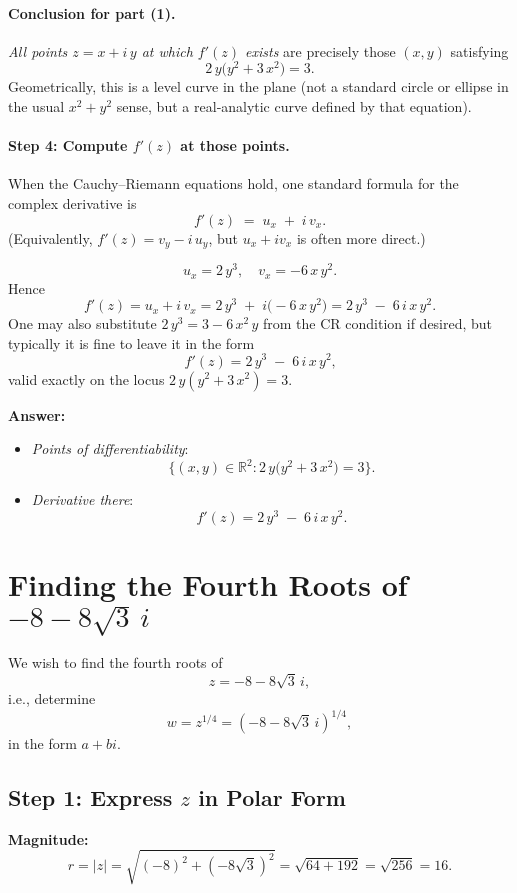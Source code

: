 \documentclass[12pt]{article}
\theoremstyle{definition} %
\theoremstyle{plain} %
\begin{document}
\paragraph{Conclusion for part (1).}
\emph{All points $z=x+ i\,y$ at which $f'(z)$ exists} are precisely those $(x,y)$ satisfying
\[
2\,y\bigl(y^{2} + 3\,x^{2}\bigr) = 3.
\]
Geometrically, this is a level curve in the plane (not a standard circle or ellipse in the usual $x^2 + y^2$ sense, but a real‐analytic curve defined by that equation).

\paragraph{Step 4: Compute $f'(z)$ at those points.}
When the Cauchy--Riemann equations hold, one standard formula for the complex derivative is
\[
f'(z) \;=\; u_{x} \;+\; i\,v_{x}.
\]
(Equivalently, $f'(z) = v_{y} - i\,u_{y}$, but $u_x + i v_x$ is often more direct.)

\[
u_{x} = 2\,y^{3},
\quad
v_{x} = -6\,x\,y^{2}.
\]
Hence
\[
f'(z) 
= u_{x} + i\,v_{x}
= 2\,y^{3} \;+\; i\bigl(-6\,x\,y^{2}\bigr)
= 2\,y^{3} \;-\; 6\,i\,x\,y^{2}.
\]
One may also substitute $2\,y^{3} = 3 - 6\,x^{2}\,y$ from the CR condition if desired, but typically it is fine to leave it in the form
\[
\boxed{\,f'(z) = 2\,y^{3} \;-\; 6\,i\,x\,y^{2},}
\]
valid exactly on the locus $2\,y(y^{2} + 3\,x^{2})=3$.

\bigskip

\noindent
\textbf{Answer:}
\begin{itemize}
\item 
\emph{Points of differentiability}: 
\[
\{(x,y)\in \mathbb{R}^2 : 2\,y\bigl(y^{2} + 3\,x^{2}\bigr) = 3\}.
\]
\item 
\emph{Derivative there}:
\[
f'(z) = 2\,y^{3} \;-\; 6\,i\,x\,y^{2}.
\]
\end{itemize}

\section*{Finding the Fourth Roots of \(-8-8\sqrt{3}\,i\)}

We wish to find the fourth roots of 
\[
z = -8-8\sqrt{3}\,i,
\]
i.e., determine
\[
w = z^{1/4} = (-8-8\sqrt{3}\,i)^{1/4},
\]
in the form \(a+bi\).

\subsection*{Step 1: Express \(z\) in Polar Form}
\textbf{Magnitude:}
\[
r = |z| = \sqrt{(-8)^2+(-8\sqrt{3})^2} = \sqrt{64+192} = \sqrt{256} = 16.
\]
\end{document}
